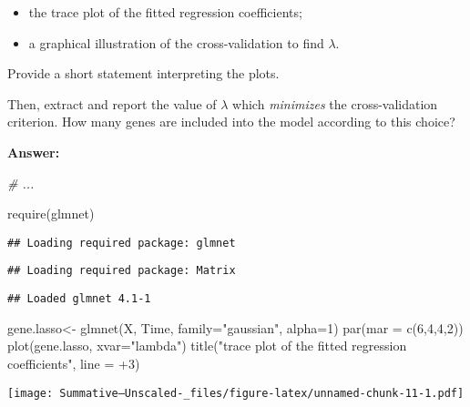 \documentclass[
]{article}
\newenvironment{Shaded}{\begin{snugshade}}{\end{snugshade}}
\newcommand{\AttributeTok}[1]{\textcolor[rgb]{0.77,0.63,0.00}{#1}}
\newcommand{\CommentTok}[1]{\textcolor[rgb]{0.56,0.35,0.01}{\textit{#1}}}
\newcommand{\DecValTok}[1]{\textcolor[rgb]{0.00,0.00,0.81}{#1}}
\newcommand{\FunctionTok}[1]{\textcolor[rgb]{0.00,0.00,0.00}{#1}}
\newcommand{\NormalTok}[1]{#1}
\newcommand{\OtherTok}[1]{\textcolor[rgb]{0.56,0.35,0.01}{#1}}
\newcommand{\SpecialCharTok}[1]{\textcolor[rgb]{0.00,0.00,0.00}{#1}}
\newcommand{\StringTok}[1]{\textcolor[rgb]{0.31,0.60,0.02}{#1}}
\providecommand{\tightlist}{%
  \setlength{\itemsep}{0pt}\setlength{\parskip}{0pt}}
\begin{document}
\begin{itemize}
\tightlist
\item
  the trace plot of the fitted regression coefficients;
\item
  a graphical illustration of the cross-validation to find \(\lambda\).
\end{itemize}

Provide a short statement interpreting the plots.

Then, extract and report the value of \(\lambda\) which \emph{minimizes}
the cross-validation criterion. How many genes are included into the
model according to this choice?

\textbf{Answer:}

\begin{Shaded}
\begin{Highlighting}[]
\CommentTok{\# ...}

\FunctionTok{require}\NormalTok{(glmnet)}
\end{Highlighting}
\end{Shaded}

\begin{verbatim}
## Loading required package: glmnet
\end{verbatim}

\begin{verbatim}
## Loading required package: Matrix
\end{verbatim}

\begin{verbatim}
## Loaded glmnet 4.1-1
\end{verbatim}

\begin{Shaded}
\begin{Highlighting}[]
\NormalTok{gene.lasso}\OtherTok{\textless{}{-}} \FunctionTok{glmnet}\NormalTok{(X, Time, }\AttributeTok{family=}\StringTok{"gaussian"}\NormalTok{, }\AttributeTok{alpha=}\DecValTok{1}\NormalTok{)}
\FunctionTok{par}\NormalTok{(}\AttributeTok{mar =} \FunctionTok{c}\NormalTok{(}\DecValTok{6}\NormalTok{,}\DecValTok{4}\NormalTok{,}\DecValTok{4}\NormalTok{,}\DecValTok{2}\NormalTok{))}
\FunctionTok{plot}\NormalTok{(gene.lasso, }\AttributeTok{xvar=}\StringTok{"lambda"}\NormalTok{)}
\FunctionTok{title}\NormalTok{(}\StringTok{"trace plot of the fitted regression coefficients"}\NormalTok{, }\AttributeTok{line =} \SpecialCharTok{+}\DecValTok{3}\NormalTok{)}
\end{Highlighting}
\end{Shaded}

\texttt{[image: Summative--Unscaled-\_files/figure-latex/unnamed-chunk-11-1.pdf]}
\end{document}
